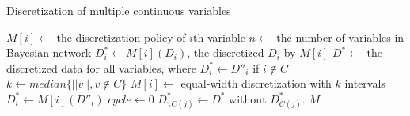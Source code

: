 \begin{algorithm}
\caption{ Discretization of multiple continuous variables}
\begin{algorithmic}[5]
\State
\State $M[i] \leftarrow$ the discretization policy of $i$th variable
\State $n \leftarrow$ the number of variables in Bayesian network
\State $D^*_i \leftarrow M[i] (D_i)$, the discretized $D_i$ by $M[i]$
\State $D^* \leftarrow $ the discretized data for all variables, where $D^*_i \leftarrow D''_i$ if $i \notin C$
\State $k \leftarrow median\{ ||v||, v\notin C\}$
\State
{}
\State $M[i] \leftarrow$  equal-width discretization with $k$ intervals
\State $D^*_i \leftarrow  M[i] (D''_i)$
\EndIf
\EndFor
\State
\State $cycle \leftarrow 0$
\State $D^*_{\backslash C(j)} \leftarrow D^*$ without $D^*_{C(j)}$.
\EndFor
\EndWhile
\State \Return $M$
\EndFunction
\end{algorithmic}
\end{algorithm}


